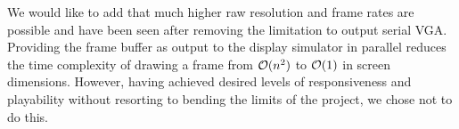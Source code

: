 We would like to add that much higher raw resolution and frame rates are possible 
and have been seen after removing the limitation to output serial VGA. Providing
the frame buffer as output to the display simulator in parallel reduces the time
complexity of drawing a frame from \(\mathcal{O} (n^2)\) to \(\mathcal{O} (1)\) in screen 
dimensions. However, having achieved desired levels of responsiveness and 
playability without resorting to bending the limits of the project, we chose not 
to do this.